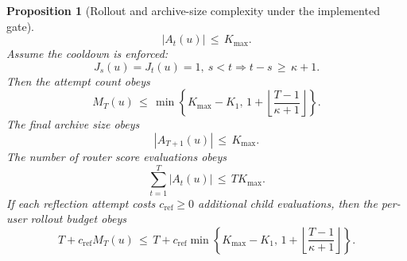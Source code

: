\documentclass{article} %
\newtheorem{proposition}[theorem]{Proposition}
\begin{document}
\begin{proposition}[Rollout and archive-size complexity under the implemented gate]
\begin{equation}
|A_t(u)|
\,\le\,
K_{\max}.
\end{equation}
Assume the cooldown is enforced:
\begin{equation}
\label{eq:app-third-rollout-cooldown}
J_s(u)=J_t(u)=1,\ s<t
\Rightarrow
t-s
\,\ge\,
\kappa+1.
\end{equation}
Then the attempt count obeys
\begin{equation}
\label{eq:app-third-rollout-m-bound}
M_T(u)
\,\le\,
\min\!\left\{
K_{\max}-K_1,\,
1+\left\lfloor\frac{T-1}{\kappa+1}\right\rfloor
\right\}.
\end{equation}
The final archive size obeys
\begin{equation}
\label{eq:app-third-rollout-archive-bound}
|A_{T+1}(u)|
\,\le\,
K_{\max}.
\end{equation}
The number of router score evaluations obeys
\begin{equation}
\label{eq:app-third-rollout-score-bound}
\sum_{t=1}^{T}
|A_t(u)|
\,\le\,
T K_{\max}.
\end{equation}
If each reflection attempt costs \(c_{\mathrm{ref}}\ge0\) additional child evaluations, then the per-user rollout budget obeys
\begin{equation}
\label{eq:app-third-rollout-budget-bound}
T+c_{\mathrm{ref}}M_T(u)
\,\le\,
T
+
c_{\mathrm{ref}}
\min\!\left\{
K_{\max}-K_1,\,
1+\left\lfloor\frac{T-1}{\kappa+1}\right\rfloor
\right\}.
\end{equation}
\end{proposition}
\end{document}
